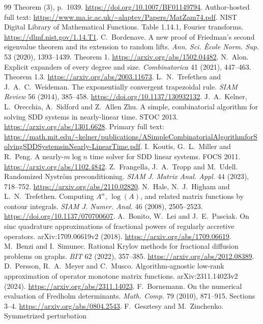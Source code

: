 \begin{thebibliography}{99}
Theorem (3), p.~1039. \url{https://doi.org/10.1007/BF01149794}.
Author-hosted full text:
\url{https://www.ma.ic.ac.uk/~alaptev/Papers/MatZam74.pdf}.
 NIST Digital Library of Mathematical Functions.
Table 1.14.1, Fourier transforms.
\url{https://dlmf.nist.gov/1.14.T1}.
 C.~Bordenave. A new proof of Friedman's second
eigenvalue theorem and its extension to random lifts.
\emph{Ann. Sci. \`Ecole Norm. Sup.} 53 (2020), 1393--1439. Theorem 1.
\url{https://arxiv.org/abs/1502.04482}.
 N.~Alon. Explicit expanders of every degree and size.
\emph{Combinatorica} 41 (2021), 447--463. Theorem 1.3.
\url{https://arxiv.org/abs/2003.11673}.
 L.~N.~Trefethen and J.~A.~C.~Weideman.
The exponentially convergent trapezoidal rule.
\emph{SIAM Review} 56 (2014), 385--458.
\url{https://doi.org/10.1137/130932132}.
 J.~A.~Kelner, L.~Orecchia, A.~Sidford and Z.~Allen Zhu.
A simple, combinatorial algorithm for solving SDD systems in
nearly-linear time. STOC 2013.
\url{https://arxiv.org/abs/1301.6628}.
Primary full text:
\url{https://math.mit.edu/~kelner/publications/ASimpleCombinatorialAlgorithmforSolvingSDDSystemsinNearly-LinearTime.pdf}.
 I.~Koutis, G.~L.~Miller and R.~Peng.
A nearly-$m\log n$ time solver for SDD linear systems. FOCS 2011.
\url{https://arxiv.org/abs/1102.4842}.
 Z.~Frangella, J.~A.~Tropp and M.~Udell.
Randomized Nystr\"om preconditioning.
\emph{SIAM J. Matrix Anal. Appl.} 44 (2023), 718--752.
\url{https://arxiv.org/abs/2110.02820}.
 N.~Hale, N.~J.~Higham and L.~N.~Trefethen.
Computing $A^\alpha$, $\log(A)$, and related matrix functions by
contour integrals. \emph{SIAM J. Numer. Anal.} 46 (2008), 2505--2523.
\url{https://doi.org/10.1137/070700607}.
 A.~Bonito, W.~Lei and J.~E.~Pasciak.
On sinc quadrature approximations of fractional powers of regularly
accretive operators. arXiv:1709.06619v2 (2018).
\url{https://arxiv.org/abs/1709.06619}.
 M.~Benzi and I.~Simunec. Rational Krylov methods for
fractional diffusion problems on graphs. \emph{BIT} 62 (2022), 357--385.
\url{https://arxiv.org/abs/2012.08389}.
 D.~Persson, R.~A.~Meyer and C.~Musco.
Algorithm-agnostic low-rank approximation of operator monotone matrix
functions. arXiv:2311.14023v2 (2024).
\url{https://arxiv.org/abs/2311.14023}.
 F.~Bornemann. On the numerical evaluation of Fredholm
determinants. \emph{Math. Comp.} 79 (2010), 871--915. Sections 3--4.
\url{https://arxiv.org/abs/0804.2543}.
 F.~Gesztesy and M.~Zinchenko. Symmetrized perturbation

\end{thebibliography}
